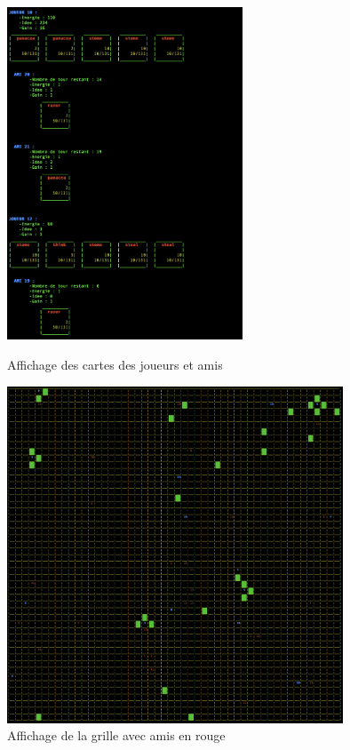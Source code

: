\documentclass[10pt,a4paper]{article}
\begin{document}
\begin{figure}[h]
    \begin{minipage}[c]{0.4\linewidth}
        \centering
        \includegraphics[width=7cm]{ami.png}
        \caption{\label{carteAmi} Affichage des cartes des joueurs et amis}
    \end{minipage}
    \hfill%
    \begin{minipage}[c]{0.48\linewidth}
        \centering
        \includegraphics[width=10cm]{grille_a.png}
        \caption{\label{grilleAmi} Affichage de la grille avec amis en rouge}
    \end{minipage}
\end{figure}

\newpage
\end{document}
